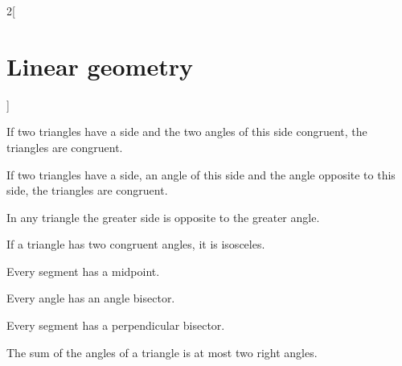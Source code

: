 \documentclass[class=article,10pt,crop=false]{standalone}
\begin{document}
\begin{multicols}{2}[\section{Linear geometry}]
\begin{theorem}
\end{theorem}
\begin{theorem}
If two triangles have a side and the two angles of this side congruent, the triangles are congruent.
\end{theorem}
\begin{theorem}
If two triangles have a side, an angle of this side and the angle opposite to this side, the triangles are congruent.
\end{theorem}
\begin{theorem}
In any triangle the greater side is opposite to the greater angle.
\end{theorem}
\begin{theorem}
If a triangle has two congruent angles, it is isosceles.
\end{theorem}
\begin{theorem}
Every segment has a midpoint.
\end{theorem}
\begin{theorem}
Every angle has an angle bisector.
\end{theorem}
\begin{theorem}
Every segment has a perpendicular bisector.
\end{theorem}
\begin{theorem}
The sum of the angles of a triangle is at most two right angles.
\end{theorem}

\end{multicols}
\end{document}
